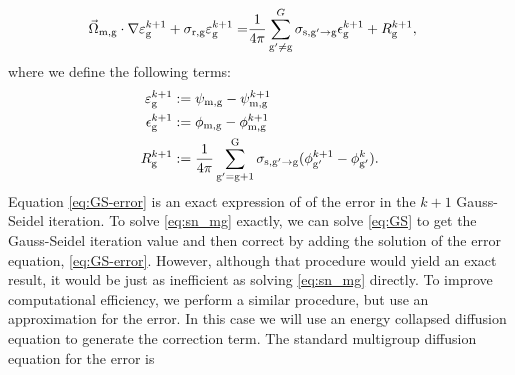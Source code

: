     \begin{equation}
    \begin{split}
      \vec{\Omega}_{\mathrm{m},\mathrm{g}} \cdot \nabla\varepsilon^{k+1}_{\mathrm{g}} + \sigma_{\mathrm{r}, \mathrm{g}}\varepsilon^{k+1}_{\mathrm{g}} = &\frac{1}{4 \pi} \sum\limits_{\mathrm{g}'\neq \mathrm{g}}^G \sigma_{\mathrm{s},{\mathrm{g}'}\to\mathrm{g}} \epsilon^{k+1}_{\mathrm{g}}   + R_{\mathrm{g}}^{k+1},
    \end{split}
    \label{eq:GS-error}
  \end{equation}
  where we define the following terms:
  \begin{align*}
      \varepsilon^{k+1}_{\mathrm{g}} &:= \psi_{\mathrm{m}, \mathrm{g}} - \psi^{k+1}_{\mathrm{m}, \mathrm{g}} \\
      \epsilon^{k+1}_{\mathrm{g}} &:= \phi_{\mathrm{m}, \mathrm{g}} - \phi^{k+1}_{\mathrm{m}, \mathrm{g}} \\
      R_{\mathrm{g}}^{k+1} &:= \frac{1}{4 \pi} \sum\limits_{\mathrm{g}'=\mathrm{g}+1}^{\mathrm{G}} \sigma_{\mathrm{s},{\mathrm{g}'}\to\mathrm{g}} (\phi^{k+1}_{\mathrm{g}'} - \phi^{k}_{\mathrm{g}'}).
  \end{align*}
  Equation \ref{eq:GS-error} is an exact expression of of the error in the $k+1$ Gauss-Seidel iteration. To solve \ref{eq:sn_mg} exactly, we can solve \ref{eq:GS} to get the Gauss-Seidel iteration value and then correct by adding the solution of the error equation, \ref{eq:GS-error}. However, although that procedure would yield an exact result, it would be just as inefficient as solving \ref{eq:sn_mg} directly. To improve computational efficiency, we perform a similar procedure, but use an approximation for the error. In this case we will use an energy collapsed diffusion equation to generate the correction term. The standard multigroup diffusion equation for the error is
  
